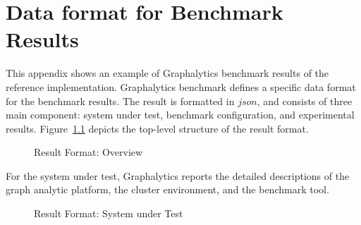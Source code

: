 \chapter{Data format for Benchmark Results}
\label{chap:data-format}
This appendix shows an example of Graphalytics benchmark results of the reference implementation. Graphalytics benchmark defines a specific data format for the benchmark results. The result is formatted in $json$, and consists of three main component: system under test, benchmark configuration, and experimental results. Figure~\ref{fig:result-format:overview} depicts the top-level structure of the result format.

\begin{figure}[h]
	\centering
	\caption{Result Format: Overview}
	\label{fig:result-format:overview}
\end{figure}

For the system under test, Graphalytics reports the detailed descriptions of the graph analytic platform, the cluster environment, and the benchmark tool.

\begin{figure}[!h]
	\centering
	\caption{Result Format: System under Test}
	\label{fig:result-format:system}
\end{figure}

